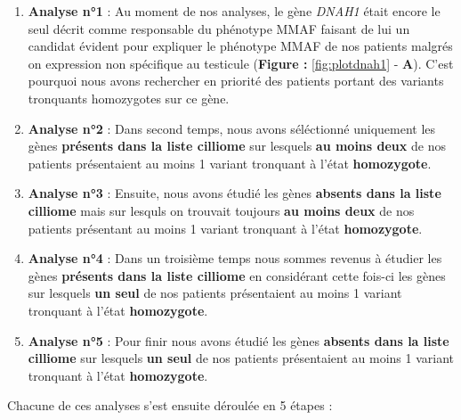 \documentclass[12pt,twoside]{reedthesis}
\theoremstyle{definition}
\theoremstyle{definition}
\theoremstyle{remark}
\begin{document}
  \begin{enumerate}
  \def\labelenumi{\arabic{enumi}.}
  \item
    \textbf{Analyse n°1} : Au moment de nos analyses, le gène \emph{DNAH1}
    était encore le seul décrit comme responsable du phénotype MMAF
    faisant de lui un candidat évident pour expliquer le phénotype MMAF de
    nos patients malgrés on expression non spécifique au testicule
    (\textbf{Figure : }\ref{fig:plotdnah1} - \textbf{A}). C'est pourquoi
    nous avons rechercher en priorité des patients portant des variants
    tronquants homozygotes sur ce gène.
  \item
    \textbf{Analyse n°2} : Dans second temps, nous avons séléctionné
    uniquement les gènes \textbf{présents dans la liste cilliome} sur
    lesquels \textbf{au moins deux} de nos patients présentaient au moins
    1 variant tronquant à l'état \textbf{homozygote}.
  \item
    \textbf{Analyse n°3} : Ensuite, nous avons étudié les gènes
    \textbf{absents dans la liste cilliome} mais sur lesquls on trouvait
    toujours \textbf{au moins deux} de nos patients présentant au moins 1
    variant tronquant à l'état \textbf{homozygote}.
  \item
    \textbf{Analyse n°4} : Dans un troisième temps nous sommes revenus à
    étudier les gènes \textbf{présents dans la liste cilliome} en
    considérant cette fois-ci les gènes sur lesquels \textbf{un seul} de
    nos patients présentaient au moins 1 variant tronquant à l'état
    \textbf{homozygote}.
  \item
    \textbf{Analyse n°5} : Pour finir nous avons étudié les gènes
    \textbf{absents dans la liste cilliome} sur lesquels \textbf{un seul}
    de nos patients présentaient au moins 1 variant tronquant à l'état
    \textbf{homozygote}.
  \end{enumerate}
  
  Chacune de ces analyses s'est ensuite déroulée en 5 étapes :
  
\end{document}
